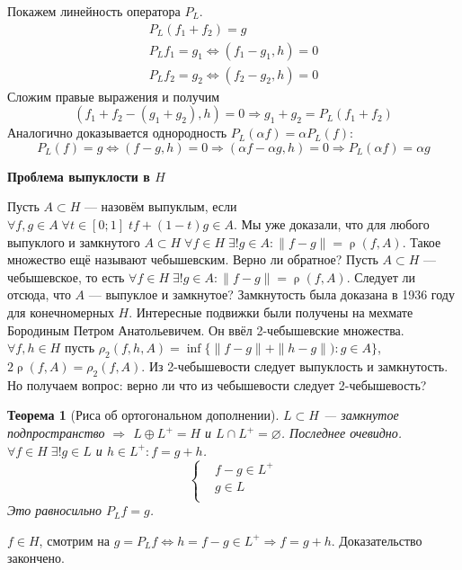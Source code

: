\documentclass[12pt]{article}
\DeclareMathOperator{\rh}{\rho}
\begin{document}
Покажем линейность оператора $P_L$.
\begin{gather*}
    P_L(f_1 + f_2) = g\\
    P_Lf_1 = g_1 \Leftrightarrow (f_1 - g_1, h) = 0\\
    P_Lf_2 = g_2 \Leftrightarrow (f_2 - g_2, h) = 0
\end{gather*}
Сложим правые выражения и получим
$$
(f_1 + f_2 - (g_1 + g_2), h) = 0 \Rightarrow g_1 + g_2 = P_L(f_1 + f_2)
$$
Аналогично доказывается однородность $P_L(\alpha f) = \alpha P_L(f)$: 
$$
P_L(f) = g \Leftrightarrow (f - g, h) = 0\Rightarrow (\alpha f - \alpha g, h) = 0\Rightarrow P_L(\alpha f) = \alpha g
$$

\textbf{Проблема выпуклости в $H$}

Пусть $A \subset H$ --- назовём выпуклым, если $\forall f,g \in A\;\forall t \in [0;1]\;t f + (1 - t) g \in A$.
Мы уже доказали, что для любого выпуклого и замкнутого $A \subset H\;\forall f \in H\;\exists! g \in A\colon \|f - g\| = \rh(f, A)$.
Такое множество ещё называют чебышевским.
Верно ли обратное? Пусть $A \subset H$ --- чебышевское, то есть $\forall f \in H\;\exists! g \in A\colon \|f - g\| = \rh(f,A)$. 
Следует ли отсюда, что $A$ --- выпуклое и замкнутое?
Замкнутость была доказана в 1936 году для конечномерных $H$.
Интересные подвижки были получены на мехмате Бородиным Петром Анатольевичем.
Он ввёл 2-чебышевские множества.
$\forall f,h \in H$ пусть $\rho_2(f, h, A) = \inf\{\|f - g\| + \|h - g\|):g \in A\}$, $2\rh(f, A) = \rho_2(f, A)$.
Из 2-чебышевости следует выпуклость и замкнутость.
Но получаем вопрос: верно ли что из чебышевости следует 2-чебышевость?

\newtheorem{Th2}{Теорема}
\begin{Th2}[Риса об ортогональном дополнении]
    $L \subset H$ --- замкнутое подпространство $\Rightarrow$ $L \oplus L^+ = H$ и $L \cap L^+ = \varnothing$.
    Последнее очевидно. 
    $\forall f \in H\;\exists! g \in L$ и $h \in L^+\colon f = g + h$.
    $$
    \left\{
        \begin{aligned}
            &f - g \in L^{+}\\
            &g \in L\\
        \end{aligned}
    \right.
    $$
    Это равносильно $P_Lf = g$.
\end{Th2}
\begin{Proof}
$f \in H$, смотрим на $g = P_Lf \Leftrightarrow h = f - g \in L^+\Rightarrow f = g + h$.
Доказательство закончено.
\end{Proof}
\end{document}
